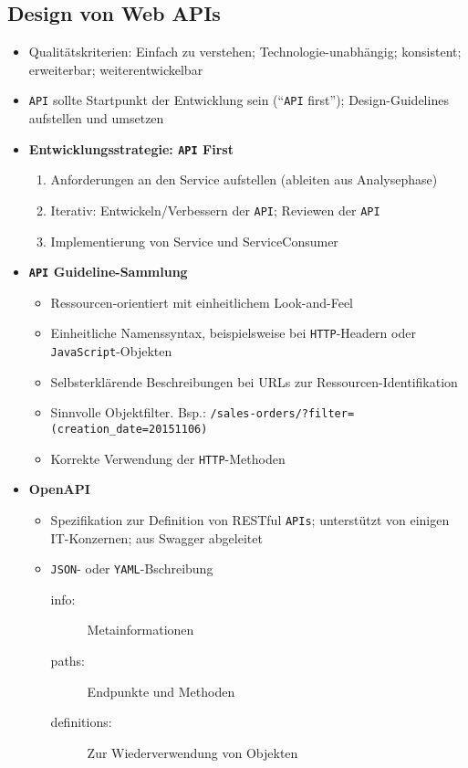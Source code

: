 \subsection{Design von Web APIs}
\begin{itemize}
	\item Qualitätskriterien: Einfach zu verstehen; Technologie-unabhängig; konsistent; erweiterbar; weiterentwickelbar
	\item \texttt{API} sollte Startpunkt der Entwicklung sein ("`\texttt{API} first"'); Design-Guidelines aufstellen und umsetzen
	\item \textbf{Entwicklungsstrategie: \texttt{API} First}
	\begin{enumerate}
		\item Anforderungen an den Service aufstellen (ableiten aus Analysephase)
		\item Iterativ: Entwickeln/Verbessern der \texttt{API}; Reviewen der \texttt{API}
		\item Implementierung von Service und ServiceConsumer
	\end{enumerate}
	\item \textbf{\texttt{API} Guideline-Sammlung}
	\begin{itemize}
		\item Ressourcen-orientiert mit einheitlichem Look-and-Feel
		\item Einheitliche Namenssyntax, beispielsweise bei \texttt{HTTP}-Headern oder \texttt{JavaScript}-Objekten
		\item Selbsterklärende Beschreibungen bei URLs zur Ressourcen-Identifikation
		\item Sinnvolle Objektfilter. Bsp.: \texttt{/sales-orders/?filter=(creation\_date=20151106)}
		\item Korrekte Verwendung der \texttt{HTTP}-Methoden
	\end{itemize}
	\item \textbf{OpenAPI}
	\begin{itemize}
		\item Spezifikation zur Definition von RESTful \texttt{APIs}; unterstützt von einigen IT-Konzernen; aus Swagger abgeleitet
		\item \texttt{JSON}- oder \texttt{YAML}-Bschreibung
		\begin{description}
			\item[info:] Metainformationen
			\item[paths:] Endpunkte und Methoden
			\item[definitions:] Zur Wiederverwendung von Objekten

\end{description}
\end{itemize}
\end{itemize}
